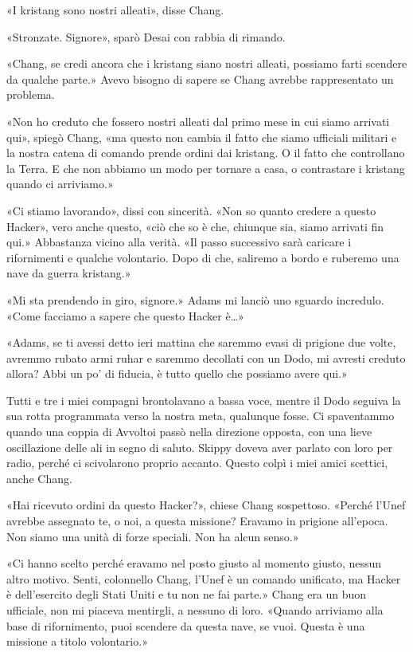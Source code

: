 «I kristang sono nostri alleati», disse Chang.

«Stronzate. Signore», sparò Desai con rabbia di rimando.

«Chang, se credi ancora che i kristang siano nostri alleati, possiamo
farti scendere da qualche parte.» Avevo bisogno di sapere se Chang
avrebbe rappresentato un problema.

«Non ho creduto che fossero nostri alleati dal primo mese in cui siamo
arrivati qui», spiegò Chang, «ma questo non cambia il fatto che siamo
ufficiali militari e la nostra catena di comando prende ordini dai
kristang. O il fatto che controllano la Terra. E che non abbiamo un modo
per tornare a casa, o contrastare i kristang quando ci arriviamo.»

«Ci stiamo lavorando», dissi con sincerità. «Non so quanto credere a
questo Hacker», vero anche questo, «ciò che so è che, chiunque sia,
siamo arrivati fin qui.» Abbastanza vicino alla verità. «Il passo
successivo sarà caricare i rifornimenti e qualche volontario. Dopo di
che, saliremo a bordo e ruberemo una nave da guerra kristang.»

«Mi sta prendendo in giro, signore.» Adams mi lanciò uno sguardo
incredulo. «Come facciamo a sapere che questo Hacker è\ldots»

«Adams, se ti avessi detto ieri mattina che saremmo evasi di prigione
due volte, avremmo rubato armi ruhar e saremmo decollati con un Dodo, mi
avresti creduto allora? Abbi un po' di fiducia, è tutto quello che
possiamo avere qui.»

Tutti e tre i miei compagni brontolavano a bassa voce, mentre il Dodo
seguiva la sua rotta programmata verso la nostra meta, qualunque fosse.
Ci spaventammo quando una coppia di Avvoltoi passò nella direzione
opposta, con una lieve oscillazione delle ali in segno di saluto. Skippy
doveva aver parlato con loro per radio, perché ci scivolarono proprio
accanto. Questo colpì i miei amici scettici, anche Chang.

«Hai ricevuto ordini da questo Hacker?», chiese Chang sospettoso.
«Perché l'Unef avrebbe assegnato te, o noi, a questa missione? Eravamo
in prigione all'epoca. Non siamo una unità di forze speciali. Non ha
alcun senso.»

«Ci hanno scelto perché eravamo nel posto giusto al momento giusto,
nessun altro motivo. Senti, colonnello Chang, l'Unef è un comando
unificato, ma Hacker è dell'esercito degli Stati Uniti e tu non ne fai
parte.» Chang era un buon ufficiale, non mi piaceva mentirgli, a nessuno
di loro. «Quando arriviamo alla base di rifornimento, puoi scendere da
questa nave, se vuoi. Questa è una missione a titolo volontario.»


